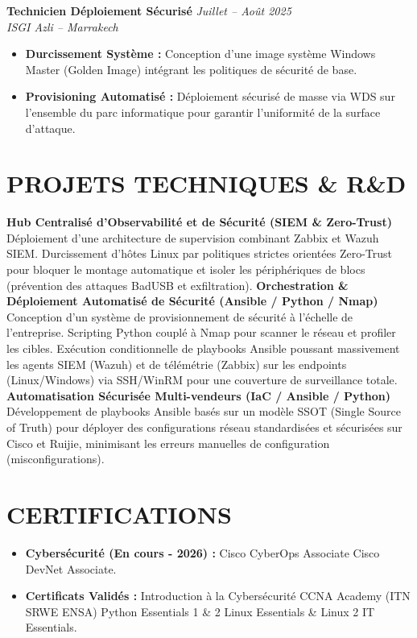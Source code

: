 \documentclass[10pt,a4paper]{article}
\begin{document}
\vspace{-0.15cm}
\noindent
\textbf{Technicien Déploiement Sécurisé} \hfill \textit{Juillet -- Août 2025}\\
\textit{ISGI Azli -- Marrakech}
\begin{itemize}[leftmargin=*, itemsep=0.0pt, parsep=0pt, topsep=0pt]
    \item \textbf{Durcissement Système :} Conception d'une image système Windows Master (Golden Image) intégrant les politiques de sécurité de base.
    \item \textbf{Provisioning Automatisé :} Déploiement sécurisé de masse via WDS sur l'ensemble du parc informatique pour garantir l'uniformité de la surface d'attaque.
\end{itemize}

\section*{PROJETS TECHNIQUES \& R\&D}
\noindent
\textbf{Hub Centralisé d'Observabilité et de Sécurité (SIEM \& Zero-Trust)}\\
Déploiement d'une architecture de supervision combinant Zabbix et Wazuh SIEM. Durcissement d'hôtes Linux par politiques strictes orientées Zero-Trust pour bloquer le montage automatique et isoler les périphériques de blocs (prévention des attaques BadUSB et exfiltration).
\textbf{Orchestration \& Déploiement Automatisé de Sécurité (Ansible / Python / Nmap)}\\
Conception d'un système de provisionnement de sécurité à l'échelle de l'entreprise. Scripting Python couplé à Nmap pour scanner le réseau et profiler les cibles. Exécution conditionnelle de playbooks Ansible poussant massivement les agents SIEM (Wazuh) et de télémétrie (Zabbix) sur les endpoints (Linux/Windows) via SSH/WinRM pour une couverture de surveillance totale.
\textbf{Automatisation Sécurisée Multi-vendeurs (IaC / Ansible / Python)}\\
Développement de playbooks Ansible basés sur un modèle SSOT (Single Source of Truth) pour déployer des configurations réseau standardisées et sécurisées sur Cisco et Ruijie, minimisant les erreurs manuelles de configuration (misconfigurations).

\section*{CERTIFICATIONS}
\begin{itemize}[leftmargin=*, itemsep=0.0pt, parsep=0pt, topsep=0pt]
    \item \textbf{Cybersécurité (En cours - 2026) :} Cisco CyberOps Associate \textbar{} Cisco DevNet Associate.
    \item \textbf{Certificats Validés :} Introduction à la Cybersécurité \textbar{} CCNA Academy (ITN \textbar{} SRWE \textbar{} ENSA) \textbar{} Python Essentials 1 \& 2 \textbar{} Linux Essentials \& Linux 2 \textbar{} IT Essentials.
\end{itemize}
\end{document}

